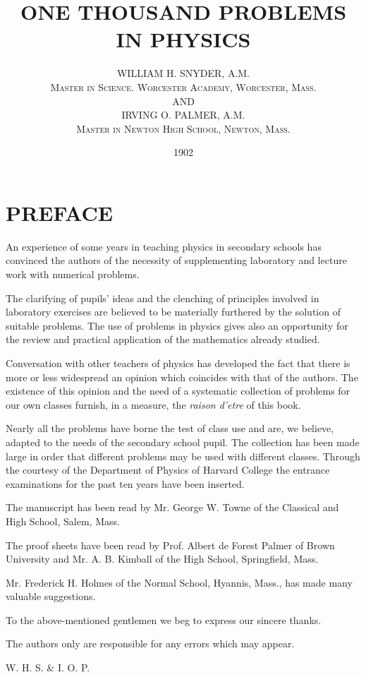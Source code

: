\documentclass[11pt]{article}
\title{\textbf{ONE THOUSAND PROBLEMS IN PHYSICS}}
\author{WILLIAM H. SNYDER, A.M.\\ \textsc{Master in Science. Worcester Academy, Worcester, Mass.}\\ \small{AND}\\ IRVING O. PALMER, A.M.\\ \textsc{Master in Newton High School, Newton, Mass.}}
\date{1902}
\begin{document}
\maketitle
\thispagestyle{empty}

\section*{PREFACE}
An experience of some years in teaching physics in secondary schools has convinced the authors of the necessity of supplementing laboratory and lecture work with numerical problems.

The clarifying of pupils' ideas and the clenching of principles involved in laboratory exercises are believed to be materially furthered by the solution of suitable problems. The use of problems in physics gives also an opportunity for the review and practical application of the mathematics already studied.

Conversation with other teachers of physics has developed the fact that there is more or less widespread an opinion which coincides with that of the authors. The existence of this opinion and the need of a systematic collection of problems for our own classes furnish, in a measure, the \emph{raison d'etre} of this book.

Nearly all the problems have borne the test of class use and are, we believe, adapted to the needs of the secondary school pupil.
The collection has been made large in order that different problems may be used with different classes. Through the courtesy of the Department of Physics of Harvard College the entrance examinations for the past ten years have been inserted.

The manuscript has been read by Mr. George W. Towne of the Classical and High School, Salem, Mass.

The proof sheets have been read by Prof. Albert de Forest Palmer of Brown University and Mr. A. B. Kimball of the High School, Springfield, Mass.

Mr. Frederick H. Holmes of the Normal School, Hyannis, Mass., has made many valuable suggestions.

To the above-mentioned gentlemen we beg to express our sincere thanks.

The authors only are responsible for any errors which may appear.

W. H. S. \& I. O. P.
\end{document}
